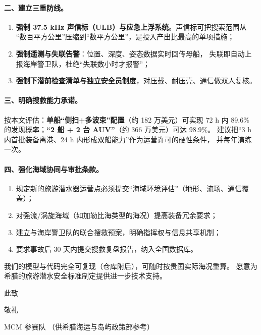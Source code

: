\paragraph{二、建立三重防线。}
\begin{enumerate}[leftmargin=1.5em,itemsep=0pt]
\item \textbf{强制 37.5 kHz 声信标（ULB）与应急上浮系统}。声信标可把搜索范围从
      “数百平方公里”压缩到“数平方公里”，是投入产出比最高的单项措施；
\item \textbf{强制遥测与失联告警}：位置、深度、姿态数据实时回传母船，
      失联即自动上报海岸警卫队，杜绝“失联数小时才报警”；
\item \textbf{强制下潜前检查清单与独立安全员制度}，对压载、耐压壳、通信做双人复核。
\end{enumerate}

\paragraph{三、明确搜救能力承诺。}
按本文评估：\textbf{单船“侧扫+多波束”配置}（约 182 万美元）可实现 72 h 内
89.6\% 的发现概率；\textbf{“2 船 + 2 台 AUV”}（约 366 万美元）可达 98.9\%。
建议把“3 h 内首批装备离港、24 h 内形成双船能力”作为运营许可的硬性条件，
并每年演练一次。

\paragraph{四、强化海域协同与审批条款。}
\begin{enumerate}[leftmargin=1.5em,itemsep=0pt]
\item 规定新的旅游潜水器运营点必须提交“海域环境评估”（地形、流场、通信覆盖）；
\item 对强流/涡旋海域（如加勒比海类型的海况）提高装备冗余要求；
\item 建立与海岸警卫队的联合搜救预案，明确指挥权与信息共享机制；
\item 要求事故后 30 天内提交搜救复盘报告，纳入全国数据库。
\end{enumerate}

\vspace{1.5mm}
\noindent 我们的模型与代码完全可复现（仓库附后），可随时按贵国实际海况重算。
愿意为希腊的旅游潜水安全标准制定提供进一步技术支持。

\vspace{3mm}
\noindent 此致

\noindent 敬礼

\vspace{2mm}
 MCM 参赛队 \quad （供希腊海运与岛屿政策部参考）

